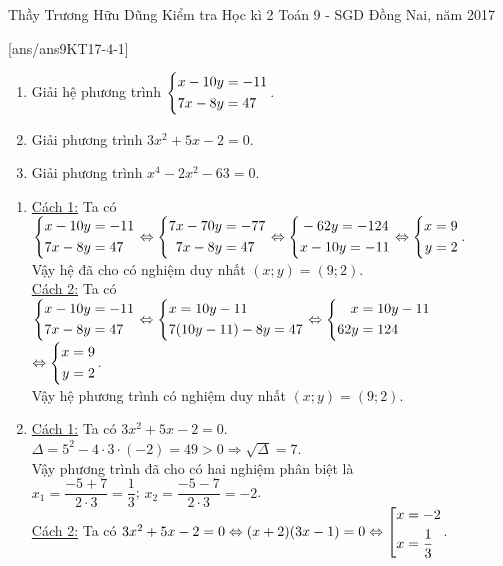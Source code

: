 \begin{name}
{Thầy  Trương Hữu Dũng}
{Kiểm tra Học kì 2 Toán 9 - SGD Đồng Nai, năm 2017}
\end{name}
\setcounter{ex}{0}
[ans/ans9KT17-4-1]
\begin{ex}%
    \begin{enumerate}
        \item Giải hệ phương trình $\left\{\begin{aligned}x-10y&=-11\\ 7x-8y&=47\end{aligned}\right.$.
        \item Giải phương trình $3x^2 + 5x -2 =0$.
        \item Giải phương trình $x^4 - 2x^2 -63=0$.
    \end{enumerate}
\loigiai
    {
    \begin{enumerate}
        \item \underline{Cách 1:} Ta có $\left\{\begin{aligned}x-10y&=-11\\ 7x-8y&=47\end{aligned}\right. \Leftrightarrow 
        \left\{\begin{aligned}7x-70y&=-77\\ 7x-8y&=47\end{aligned}\right. \Leftrightarrow \left\{\begin{aligned}&-62y=-124\\ &x-10y=-11\end{aligned}\right. \Leftrightarrow \left\{\begin{aligned}x&=9\\ y&=2\end{aligned}\right.$.\\
        Vậy hệ đã cho có nghiệm duy nhất $(x;y)=(9;2).$ \\
        \underline{Cách 2:} Ta có $\left\{\begin{aligned}x-10y&=-11\\ 7x-8y&=47\end{aligned}\right. \Leftrightarrow \left\{\begin{aligned}&x=10y-11\\ &7(10y-11)-8y=47\end{aligned}\right. \Leftrightarrow 
        \left\{\begin{aligned}x&=10y-11\\ 62y&=124\end{aligned}\right.$\\ $\Leftrightarrow \left\{\begin{aligned}x&=9\\ y&=2\end{aligned}\right.$.\\
        Vậy hệ phương trình có nghiệm duy nhất $(x; y)=(9;2)$.
        \item \underline{Cách 1:} Ta có $3x^2 +5x -2=0$.\\
        $\Delta = 5^2-4 \cdot 3 \cdot (-2)=49 >0 \Rightarrow \sqrt{\Delta}=7$.\\
        Vậy phương trình đã cho có hai nghiệm phân biệt là\\
        $x_1=\dfrac{-5+7}{2 \cdot 3}=\dfrac{1}{3}$; $x_2=\dfrac{-5-7}{2 \cdot 3}=-2$.\\
        \underline{Cách 2:} Ta có $3x^2 +5x -2=0 \Leftrightarrow (x+2)(3x-1)=0 \Leftrightarrow \left[\begin{aligned}x&=-2\\ x&=\dfrac{1}{3}\end{aligned}\right.$.\\

\end{enumerate}}
\end{ex}
